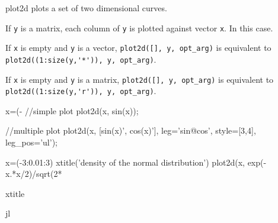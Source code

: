 \begin{mandescription}
  plot2d plots a set of two dimensional curves.

  If \verb+y+ is a matrix, each column of \verb+y+ is plotted against vector
  \verb+x+. In this case.

  If \verb+x+ is empty and \verb+y+ is a vector, \verb+plot2d([], y, opt_arg)+ is
  equivalent to \verb|plot2d((1:size(y,'*')), y, opt_arg)|.

  If \verb+x+ is empty and \verb+y+ is a matrix, \verb+plot2d([], y, opt_arg)+ is
  equivalent to \verb|plot2d((1:size(y,'r')), y, opt_arg)|.  
\end{mandescription}

\begin{examples}
  \begin{program}
    x=(-%
    //simple plot
    plot2d(x, sin(x));

    //multiple plot
    plot2d(x, [sin(x)', cos(x)'], leg='sin@cos', style=[3,4], leg_pos='ul');

    x=(-3:0.01:3)
    xtitle('density of the normal distribution')
    plot2d(x, exp(-x.*x/2)/sqrt(2*%
  \end{program}
\end{examples}

\begin{manseealso}
  xtitle
\end{manseealso}

\begin{authors}
   jl
\end{authors}
